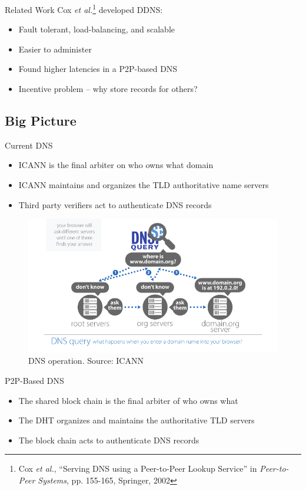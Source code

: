 \documentclass[11pt]{beamer}
\begin{document}
\begin{frame}{Related Work}
	Cox \textit{et al.}\footnote{Cox \textit{et al.}, ``Serving DNS using a Peer-to-Peer Lookup Service'' in \textit{Peer-to-Peer Systems}, pp. 155-165, Springer, 2002 } developed DDNS:
	\begin{itemize}
		\item Fault tolerant, load-balancing, and scalable
		\item Easier to administer
		\item Found higher latencies in a P2P-based DNS
		\item Incentive problem --  why store records for others?
	\end{itemize}
\end{frame}

\subsection{Big Picture}

\begin{frame}{Current DNS}
	\begin{itemize}
		\item ICANN is the final arbiter on who owns what domain
		\item ICANN maintains and organizes the TLD authoritative name servers
		\item Third party verifiers act to authenticate DNS records
	\end{itemize}

\begin{figure}
\centering
\includegraphics[width=0.6\linewidth]{figs/dns}
\caption{DNS operation. Source: ICANN}
\label{fig:dns}
\end{figure}


\end{frame}


\begin{frame}{P2P-Based DNS}
	
	\begin{itemize}
		\item The shared block chain is the final arbiter of who owns what
		\item The DHT organizes and maintains the authoritative TLD servers
		\item The block chain acts to authenticate DNS records
	\end{itemize}
\end{frame}
\end{document}

